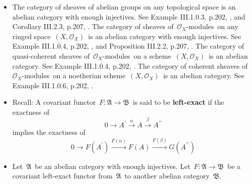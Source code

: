 \begin{itemize}
\item
	The category of sheaves of abelian groups on any topological space is an abelian category with enough injectives.
	See Example III.1.0.3, p.202, \cite{hartshorne1977algebraic}, and Corollary III.2.3, p.207, \cite{hartshorne1977algebraic}.
	\vskip 0.05cm
	The category of sheaves of \,$\mathcal{O}_{X}$-modules\, on any ringed space \,$(X,\mathcal{O}_{X})$\,
	is an abelian category with enough injectives.
	See Example III.1.0.4, p.202, \cite{hartshorne1977algebraic}, and Proposition III.2.2, p.207, \cite{hartshorne1977algebraic}.
	\vskip 0.05cm
	The category of quasi-coherent sheaves of \,$\mathcal{O}_{X}$-modules\,
	on a scheme \,$(X,\mathcal{O}_{X})$\, is an abelian category.
	See Example III.1.0.4, p.202, \cite{hartshorne1977algebraic}.
	\vskip 0.05cm
	The category of coherent sheaves of \,$\mathcal{O}_{X}$-modules\,
	on a noetherian scheme \,$(X,\mathcal{O}_{X})$\, is an abelian category.
	See Example III.1.0.6, p.202, \cite{hartshorne1977algebraic}.
	\vskip 0.3cm

\item
	Recall:\; A covariant functor \,$F : \mathfrak{A} \longrightarrow \mathfrak{B}$\,
	is said to be \textbf{left-exact} if the exactness of
	\begin{equation*}
	0 \longrightarrow A^{\prime} \overset{\alpha}{\longrightarrow} A \overset{\beta}{\longrightarrow} A^{\prime\prime}
	\end{equation*}
	implies the exactness of
	\begin{equation*}
	0
	\longrightarrow F(A^{\prime})
	\overset{F(\alpha)}{\longrightarrow} F(A)
	\overset{F(\beta)}{\longrightarrow} G(A^{\prime\prime})
	\end{equation*}
	\vskip 0.3cm

\item
	Let \,$\mathfrak{A}$\, be an abelian category with enough injectives.
	Let \,$F : \mathfrak{A} \longrightarrow \mathfrak{B}$\, be a covariant left-exact functor
	from \,$\mathfrak{A}$\, to another abelian category \,$\mathfrak{B}$.\,


\end{itemize}
